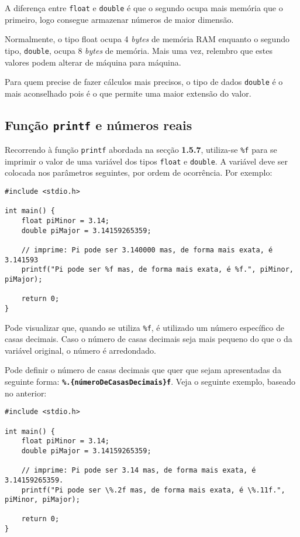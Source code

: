 A diferença entre \texttt{float} e \texttt{double} é que o segundo ocupa mais memória que o primeiro, logo consegue armazenar números de maior dimensão.

Normalmente, o tipo float ocupa 4 \textit{bytes} de memória RAM enquanto o segundo tipo, \texttt{double}, ocupa 8 \textit{bytes} de memória. Mais uma vez, relembro que estes valores podem alterar de máquina para máquina.

Para quem precise de fazer cálculos mais precisos, o tipo de dados \texttt{double} é o mais aconselhado pois é o que permite uma maior extensão do valor.

\subsection{Função \texttt{printf} e números reais}

Recorrendo à função \texttt{printf} abordada na secção \textbf{1.5.7}, utiliza-se \texttt{\%f} para se imprimir o valor de uma variável dos tipos \texttt{float} e \texttt{double}. A variável deve ser colocada nos parâmetros seguintes, por ordem de ocorrência. Por exemplo:

\begin{lstlisting}
#include <stdio.h>
 
int main() {    
    float piMinor = 3.14;
    double piMajor = 3.14159265359;
 	
	// imprime: Pi pode ser 3.140000 mas, de forma mais exata, é 3.141593 
    printf("Pi pode ser %f mas, de forma mais exata, é %f.", piMinor, piMajor);
    
    return 0;
}
\end{lstlisting}

Pode visualizar que, quando se utiliza \texttt{\%f}, é utilizado um número específico de casas decimais. Caso o número de casas decimais seja mais pequeno do que o da variável original, o número é arredondado.

Pode definir o número de casas decimais que quer que sejam apresentadas da seguinte forma: \texttt{\textbf{\%.\{númeroDeCasasDecimais\}f}}. Veja o seguinte exemplo, baseado no anterior:

\begin{lstlisting}
#include <stdio.h>
 
int main() {    
    float piMinor = 3.14;
    double piMajor = 3.14159265359;
 	
	// imprime: Pi pode ser 3.14 mas, de forma mais exata, é 3.14159265359.
    printf("Pi pode ser \%.2f mas, de forma mais exata, é \%.11f.", piMinor, piMajor);
         
    return 0;
}
\end{lstlisting}

